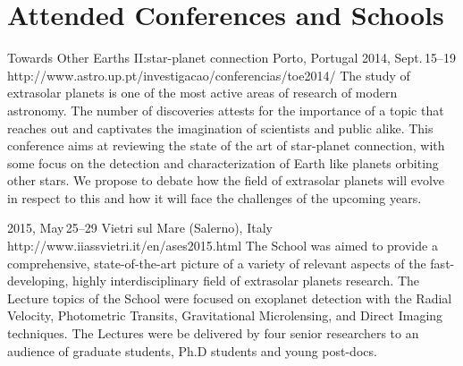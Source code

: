 \section{Attended Conferences and Schools}\label{appsec:conferences}

{Towards Other Earths II:\@The star-planet connection}%
{Porto, Portugal}%
{2014, Sept.\,15--19}%
{http://www.astro.up.pt/investigacao/conferencias/toe2014/}%
{}%
{The study of extrasolar planets is one of the most active areas of research of modern astronomy.
The number of discoveries attests for the importance of a topic that reaches out and captivates the imagination of scientists and public alike.
This conference aims at reviewing the state of the art of star-planet connection, with some focus on the detection and characterization of Earth like planets orbiting other stars.
We propose to debate how the field of extrasolar planets will evolve in respect to this and how it will face the challenges of the upcoming years.}%

{2015, May\,25--29}%
{Vietri sul Mare (Salerno), Italy}%
{http://www.iiassvietri.it/en/ases2015.html}%
{}%
{The School was aimed to provide a comprehensive, state-of-the-art picture of a variety of relevant aspects of the fast-developing, highly interdisciplinary field of extrasolar planets research.
The Lecture topics of the School were focused on exoplanet detection with the Radial Velocity, Photometric Transits, Gravitational Microlensing, and Direct Imaging techniques.
The Lectures were be delivered by four senior researchers to an audience of graduate students, Ph.D students and young post-docs.}%

